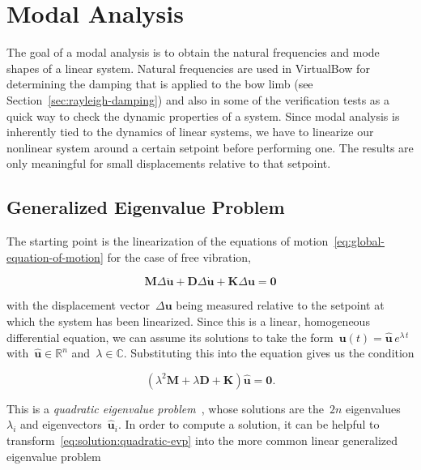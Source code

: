 
\chapter{Modal Analysis}

The goal of a modal analysis is to obtain the natural frequencies and mode shapes of a linear system.
Natural frequencies are used in VirtualBow for determining the damping that is applied to the bow limb (see Section~\ref{sec:rayleigh-damping}) and also in some of the verification tests as a quick way to check the dynamic properties of a system.
Since modal analysis is inherently tied to the dynamics of linear systems, we have to linearize our nonlinear system around a certain setpoint before performing one.
The results are only meaningful for small displacements relative to that setpoint.

\section{Generalized Eigenvalue Problem}

The starting point is the linearization of the equations of motion~\eqref{eq:global-equation-of-motion} for the case of free vibration,

\begin{equation}
\boldsymbol{M}\Delta\ddot{\boldsymbol{u}} + \boldsymbol{D}\Delta\dot{\boldsymbol{u}} + \boldsymbol{K}\Delta\boldsymbol{u} = \boldsymbol{0} \label{eq:solution:ode-linearized}
\end{equation}

with the displacement vector~$\Delta\boldsymbol{u}$ being measured relative to the setpoint at which the system has been linearized.
Since this is a linear, homogeneous differential equation, we can assume its solutions to take the form~$\boldsymbol{u}(t) = \hat{\boldsymbol{u}}\,e^{\lambda\,t}$ with~$\hat{\boldsymbol{u}} \in \mathbb{R}^n$ and~$\lambda \in \mathbb{C}$. Substituting this into the equation gives us the condition

\begin{equation}
\left(\lambda^2 \boldsymbol{M} + \lambda \boldsymbol{D} + \boldsymbol{K}\right)\hat{\boldsymbol{u}} = \boldsymbol{0}. \label{eq:solution:quadratic-evp}
\end{equation}

This is a \textit{quadratic eigenvalue problem}~\cite{bib:dw07}, whose solutions are the~$2n$ eigenvalues~$\lambda_{i}$ and eigenvectors~$\hat{\boldsymbol{u}}_{i}$.
In order to compute a solution, it can be helpful to transform~\eqref{eq:solution:quadratic-evp} into the more common linear generalized eigenvalue problem

